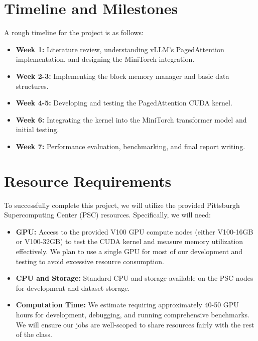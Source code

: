 \documentclass{article}
\begin{document}
\section{Timeline and Milestones}
\label{sec:timeline}

A rough timeline for the project is as follows:
\begin{itemize}
    \item \textbf{Week 1:} Literature review, understanding vLLM's PagedAttention implementation, and designing the MiniTorch integration.
    \item \textbf{Week 2-3:} Implementing the block memory manager and basic data structures.
    \item \textbf{Week 4-5:} Developing and testing the PagedAttention CUDA kernel.
    \item \textbf{Week 6:} Integrating the kernel into the MiniTorch transformer model and initial testing.
    \item \textbf{Week 7:} Performance evaluation, benchmarking, and final report writing.
\end{itemize}

\section{Resource Requirements}
\label{sec:resources}

To successfully complete this project, we will utilize the provided Pittsburgh Supercomputing Center (PSC) resources. Specifically, we will need:
\begin{itemize}
    \item \textbf{GPU:} Access to the provided V100 GPU compute nodes (either V100-16GB or V100-32GB) to test the CUDA kernel and measure memory utilization effectively. We plan to use a single GPU for most of our development and testing to avoid excessive resource consumption.
    \item \textbf{CPU and Storage:} Standard CPU and storage available on the PSC nodes for development and dataset storage.
    \item \textbf{Computation Time:} We estimate requiring approximately 40-50 GPU hours for development, debugging, and running comprehensive benchmarks. We will ensure our jobs are well-scoped to share resources fairly with the rest of the class.
\end{itemize}



\end{document}
